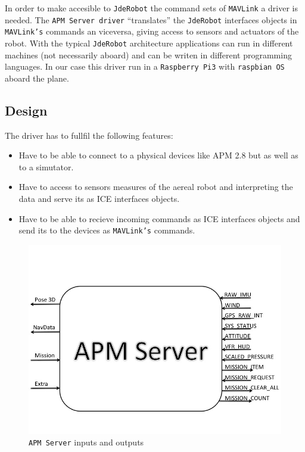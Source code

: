\documentclass{llncs}
\begin{document}
In order to make accesible to \texttt{JdeRobot} the command sets of \texttt{MAVLink} a driver is needed. The \texttt{APM Server driver} ``translates'' the \texttt{JdeRobot} interfaces objects in \texttt{MAVLink's} commands an viceversa, giving access to sensors and actuators of the robot. With the typical \texttt{JdeRobot} architecture applications can run in different machines (not necessarily aboard) and can be writen in different programming languages. 
In our case this driver run in a \texttt{Raspberry Pi3} with \texttt{raspbian OS} aboard the plane.

\subsection{Design}
\label{sec:design}

The driver has to fullfil the following features:

\begin{itemize}
\item Have to be able to connect to a physical devices like APM 2.8 but as well as to a simutator.
\item Have to access to sensors measures of the aereal robot and interpreting the data and serve its as ICE interfaces objects.
\item Have to be able to recieve incoming commands as ICE interfaces objects and send its to the devices as \texttt{MAVLink's} commands.
\end{itemize}

\begin{figure}[h]
  \centering
  \includegraphics[scale=0.5]{img/diseno.jpg}
  \caption{\texttt{APM Server} inputs and outputs}
  \label{fig:diseno_apms_caja_negra}
\end{figure}
\end{document}
